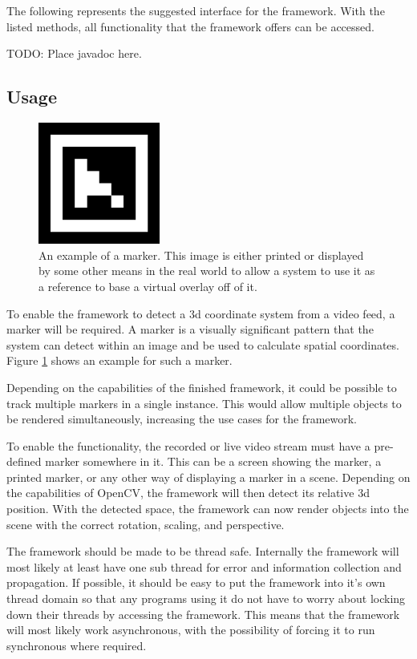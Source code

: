 The following represents the suggested interface for the framework.
With the listed methods, all functionality that the framework offers can be accessed.

TODO: Place javadoc here.

\subsection{Usage}

\begin{figure}
	\centering
	\includegraphics[width=4cm]{images/marker_example.png}
	\caption[Example Marker.]{An example of a marker. This image is either printed or displayed by some other means in the real world to allow a system to use it as a reference to base a virtual overlay off of it.}
	\label{fig:marker_example}
\end{figure}

To enable the framework to detect a 3d coordinate system from a video feed, a marker will be required.
A marker is a visually significant pattern that the system can detect within an image and be used to calculate spatial coordinates. Figure \ref{fig:marker_example} shows an example for such a marker.

Depending on the capabilities of the finished framework, it could be possible to track multiple markers in a single instance.
This would allow multiple objects to be rendered simultaneously, increasing the use cases for the framework.

To enable the functionality, the recorded or live video stream must have a pre-defined marker somewhere in it.
This can be a screen showing the marker, a printed marker, or any other way of displaying a marker in a scene.
Depending on the capabilities of OpenCV, the framework will then detect its relative 3d position.
With the detected space, the framework can now render objects into the scene with the correct rotation, scaling, and perspective.

The framework should be made to be thread safe.
Internally the framework will most likely at least have one sub thread for error and information collection and propagation.
If possible, it should be easy to put the framework into it's own thread domain so that any programs using it do not have to worry about locking down their threads by accessing the framework.
This means that the framework will most likely work asynchronous, with the possibility of forcing it to run synchronous where required.

